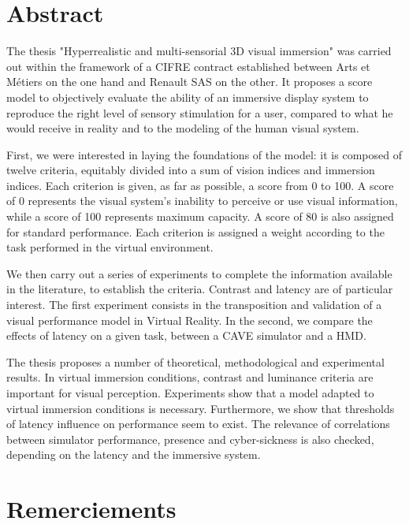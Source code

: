 \chapter*{Abstract}
\par The thesis "Hyperrealistic and multi-sensorial 3D visual immersion" was carried out within the framework of a CIFRE contract established between Arts et Métiers on the one hand and Renault SAS on the other. It proposes a score model to objectively evaluate the ability of an immersive display system to reproduce the right level of sensory stimulation for a user, compared to what he would receive in reality and to the modeling of the human visual system.

\par First, we were interested in laying the foundations of the model: it is composed of twelve criteria, equitably divided into a sum of vision indices and immersion indices. Each criterion is given, as far as possible, a score from 0 to 100. A score of 0 represents the visual system's inability to perceive or use visual information, while a score of 100 represents maximum capacity. A score of 80 is also assigned for standard performance. Each criterion is assigned a weight according to the task performed in the virtual environment.

\par We then carry out a series of experiments to complete the information available in the literature, to establish the criteria. Contrast and latency are of particular interest. The first experiment consists in the transposition and validation of a visual performance model in Virtual Reality. In the second, we compare the effects of latency on a given task, between a CAVE simulator and a HMD.

\par The thesis proposes a number of theoretical, methodological and experimental results. In virtual immersion conditions, contrast and luminance criteria are important for visual perception. Experiments show that a model adapted to virtual immersion conditions is necessary. Furthermore, we show that thresholds of latency influence on performance seem to exist. The relevance of correlations between simulator performance, presence and cyber-sickness is also checked, depending on the latency and the immersive system.

\chapter*{Remerciements}
